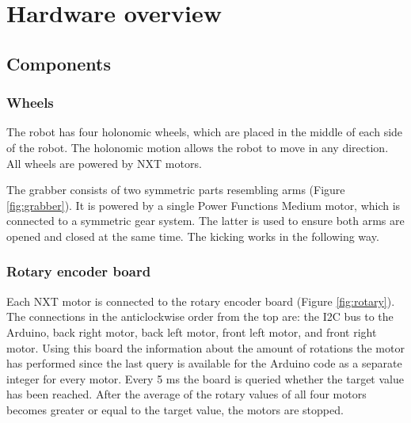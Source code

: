 \documentclass[a4paper,12pt]{article}
\begin{document}
\section{Hardware overview}

\subsection{Components}
\subsubsection{Wheels}
The robot has four holonomic wheels, which are placed in the middle of each side of the robot. The holonomic motion allows the robot to move in any direction. All wheels are powered by NXT motors.

The grabber consists of two symmetric parts resembling arms (Figure \ref{fig:grabber}). It is powered by a single Power Functions Medium motor, which is connected to a symmetric gear system. The latter is used to ensure both arms are opened and closed at the same time. The kicking works in the following way. 


\subsubsection{Rotary encoder board}

Each NXT motor is connected to the rotary encoder board (Figure \ref{fig:rotary}). The connections in the anticlockwise order from the top are: the I2C bus to the Arduino, back right motor, back left motor, front left motor, and front right motor. Using this board the information about the amount of rotations the motor has performed since the last query is available for the Arduino code as a separate integer for every motor. Every 5 ms the board is queried whether the target value has been reached. After the average of the rotary values of all four motors becomes greater or equal to the target value, the motors are stopped.

\end{document}
